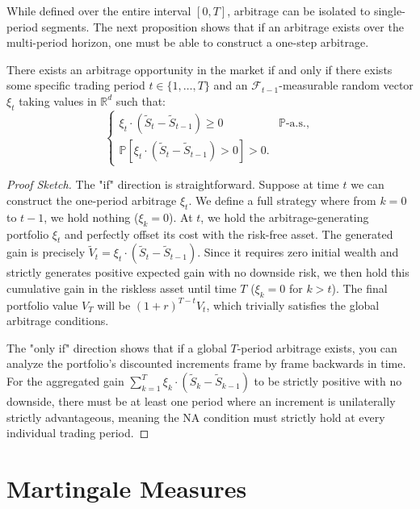 While defined over the entire interval $[0, T]$, arbitrage can be isolated to single-period segments. The next proposition shows that if an arbitrage exists over the multi-period horizon, one must be able to construct a one-step arbitrage.

\begin{proposition} \label{prop:arbitrage_equivalent}
There exists an arbitrage opportunity in the market if and only if there exists some specific trading period $t \in \{1, \dots, T\}$ and an $\mathcal{F}_{t-1}$-measurable random vector $\xi_t$ taking values in $\mathbb{R}^d$ such that:
\begin{equation}
\begin{cases}
    \xi_t \cdot (\tilde{S}_t - \tilde{S}_{t-1}) \geq 0 & \mathbb{P}\text{-a.s.}, \\
    \mathbb{P}\left[\xi_t \cdot (\tilde{S}_t - \tilde{S}_{t-1}) > 0\right] > 0.
\end{cases}
\end{equation}
\end{proposition}

\begin{proof}[Proof Sketch]
The "if" direction is straightforward. Suppose at time $t$ we can construct the one-period arbitrage $\xi_t$. We define a full strategy where from $k=0$ to $t-1$, we hold nothing ($\xi_k = 0$). At $t$, we hold the arbitrage-generating portfolio $\xi_t$ and perfectly offset its cost with the risk-free asset. The generated gain is precisely $\tilde{V}_t = \xi_t \cdot (\tilde{S}_t - \tilde{S}_{t-1})$. Since it requires zero initial wealth and strictly generates positive expected gain with no downside risk, we then hold this cumulative gain in the riskless asset until time $T$ ($\xi_k = 0$ for $k > t$). The final portfolio value $V_T$ will be $(1+r)^{T-t} V_t$, which trivially satisfies the global arbitrage conditions.

The "only if" direction shows that if a global $T$-period arbitrage exists, you can analyze the portfolio's discounted increments frame by frame backwards in time. For the aggregated gain $\sum_{k=1}^T \xi_k \cdot (\tilde{S}_k - \tilde{S}_{k-1})$ to be strictly positive with no downside, there must be at least one period where an increment is unilaterally strictly advantageous, meaning the NA condition must strictly hold at every individual trading period.
\end{proof}

\section{Martingale Measures}

